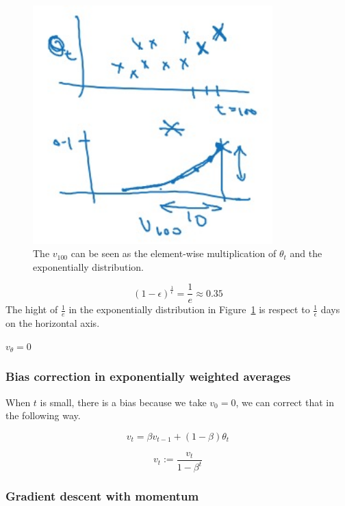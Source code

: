 \documentclass[UTF8]{article}
\begin{document}
\begin{figure}[htb]
    \centering
    \includegraphics[width=25em]{figures/exp-weighted-average}
    \caption{The $v_{100}$ can be seen as the element-wise multiplication of $\theta_t$ and the
    exponentially distribution.}
    \label{fig:exp-weighted-average}
\end{figure}

$$ (1 - \epsilon)^{\frac{1}{\epsilon}} = \frac{1}{e} \approx 0.35 $$
The hight of $\displaystyle \frac{1}{e}$ in the exponentially distribution in
Figure~\ref{fig:exp-weighted-average} is respect to $\displaystyle \frac{1}{\epsilon}$ days on the
horizontal axis.

\begin{algorithm}[htb]
    $v_{\theta} = 0$ \\
\end{algorithm}

\subsubsection{Bias correction in exponentially weighted averages}
When $t$ is small, there is a bias because we take $v_0 = 0$, we can correct that in the following
way.

$$ v_t = \beta v_{t-1} + (1-\beta)\theta_t $$

$$ v_t := \frac{v_t}{1 - \beta^t} $$

\subsubsection{Gradient descent with momentum}
\end{document}
